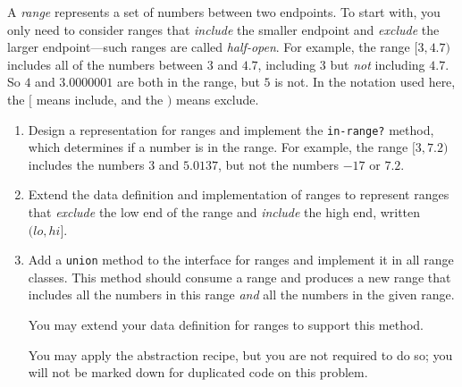 \documentclass[12pt]{article}                   %
\def\pts#1{\marginpar{\footnotesize \raggedright  \fbox{#1 {\sc Points}}}}
\begin{document}
\vfill\thispagestyle{empty}
\newpage

\fi






\begin{problem}\pts{17} %

A \emph{range} represents a set of numbers between two endpoints.  To
start with, you only need to consider ranges that \emph{include} the
smaller endpoint and \emph{exclude} the larger endpoint---such ranges
are called \emph{half-open}.  For example, the range $[3,4.7)$
includes all of the numbers between $3$ and $4.7$, including $3$ but
\emph{not} including $4.7$. So $4$ and $3.0000001$ are both in the
range, but $5$ is not.  In the notation used here, the $[$ means
include, and the $)$ means exclude.

\smallskip

\noindent
\begin{enumerate}
\item Design a representation for ranges and implement the
  \texttt{in-range?} method, which determines if a number is in the
  range.  For example, the range $[3,7.2)$ includes the numbers $3$
  and $5.0137$, but not the numbers $-17$ or $7.2$.

\item Extend the data definition and implementation of ranges to
  represent ranges that \emph{exclude} the low end of the range and
  \emph{include} the high end, written $(lo,hi]$.  

\item Add a \texttt{union} method to the interface for ranges and
  implement it in all range classes.  This method should consume a
  range and produces a new range that includes all the numbers in this
  range \emph{and} all the numbers in the given range.

  You may extend your data definition for ranges to
  support this method.

  You may apply the abstraction recipe, but you are not required to do
  so; you will not be marked down for duplicated code on this problem.
\end{enumerate}

\newpage
\ifrubric{}
\newpage
\fi


\end{problem}
\end{document}
